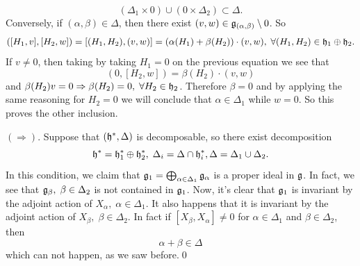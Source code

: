 \begin{equation}
    (\Delta_1\times 0) \cup (0\times\Delta_2)\subset \Delta.
\end{equation}
Conversely, if $(\alpha,\beta)\in\Delta$, then there exist $(v,w)\in\mathfrak{g}_{(\alpha,\beta)}\setminus0$. So
\begin{equation}
    \begin{split}
       ([H_1,v],[H_2,w]) =[(H_1,H_2),(v,w)]=(\alpha(H_1)+\beta(H_2))\cdot(v,w),\;\forall (H_1,H_2)\in\mathfrak{h}_1\oplus\mathfrak{h}_2.
    \end{split}
\end{equation}
If $v\neq0$, then taking by taking $H_1=0$ on the previous equation we see that 
\begin{equation}
    (0,[H_2,w])=\beta(H_2)\cdot(v,w)
\end{equation}
and $\beta(H_2)v = 0\Rightarrow \beta(H_2)=0,\;\forall H_2\in\mathfrak{h}_2$. Therefore $\beta=0$ and by applying 
the same reasoning for $H_2=0$ we will conclude that $\alpha\in\Delta_1$ while $w=0$. So this proves the other inclusion.\par 

$(\Rightarrow)$. Suppose that $(\mathfrak{h}^*,\Delta)$ is decomposable, so there exist decomposition 
\begin{equation}
    \mathfrak{h}^*=\mathfrak{h}_1^*\oplus\mathfrak{h}_2^*,\;\Delta_i=\Delta\cap\mathfrak{h}_i^*, \Delta=\Delta_1\cup\Delta_2.
\end{equation}
In this condition, we claim that $\mathfrak{g}_1=\bigoplus_{\alpha\in\Delta_1}\mathfrak{g}_\alpha$ is a proper ideal 
in $\mathfrak{g}$. In fact, we see that $\mathfrak{g}_\beta,\;\beta\in\Delta_2$ is not contained in $\mathfrak{g}_1$. Now, it's clear 
that $\mathfrak{g}_1$ is invariant by the adjoint action of $X_\alpha,\;\alpha\in\Delta_1$. It also happens that it is 
invariant by the adjoint action of $X_\beta,\;\beta\in\Delta_2$. In fact if $[X_\beta, X_\alpha]\neq0$ for $\alpha\in\Delta_1$ and 
$\beta\in\Delta_2$, then 
\begin{equation}
    \alpha+\beta\in\Delta
\end{equation}
which can not happen, as we saw before.\qed

